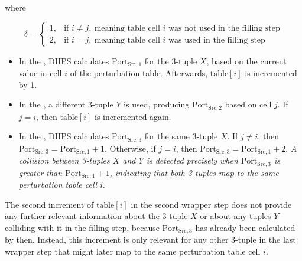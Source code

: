 \documentclass[twocolumn]{report}
\begin{document}
where
\vspace{-1cm}
\begin{center}
	\begin{adjustbox}{max width=\columnwidth}
		\begin{minipage}[t]{0.6\textwidth}
			\[
				\delta =
				\begin{cases}
					1, & \text{if } i \neq j,\ \text{meaning table cell } i \text{ was not used in the filling step}\\
					2, & \text{if } i = j,\ \text{meaning table cell } i \text{ was used in the filling step}
				\end{cases}
			\]
		\end{minipage}
	\end{adjustbox}
\end{center}
\vspace{0.5cm}
\begin{itemize}
	\item In the , DHPS calculates \(\text{Port}_{\text{Src},1}\) for the 3-tuple \( X \), based on the current value in cell \( i \) of the perturbation table. Afterwards, \(\text{table}[i]\) is incremented by 1.
	\item In the , a different 3-tuple \( Y \) is used, producing \(\text{Port}_{\text{Src},2}\) based on cell \( j \). If \( j = i \), then \(\text{table}[i]\) is incremented again.
	\item In the , DHPS calculates \(\text{Port}_{\text{Src},3}\) for the same 3-tuple \( X \). If \( j \neq i \), then \(\text{Port}_{\text{Src},3} = \text{Port}_{\text{Src},1} + 1\). Otherwise, if \( j = i \), then \(\text{Port}_{\text{Src},3} = \text{Port}_{\text{Src},1} + 2\). \textit{A collision between 3-tuples \( X \) and \( Y \) is detected precisely when \(\text{Port}_{\text{Src},3}\) is greater than \(\text{Port}_{\text{Src},1} + 1\), indicating that both 3-tuples map to the same perturbation table cell \( i \)}.
\end{itemize}

The second increment of \(\text{table}[i]\) in the second wrapper step does \alert{not provide any further relevant information} about the 3-tuple \( X \) or about any tuples \( Y \) colliding with it in the filling step, because \(\text{Port}_{\text{Src},3}\) has already been calculated by then. Instead, this increment is only relevant for any other 3-tuple in the last wrapper step that might later map to the same perturbation table cell \( i \).
\end{document}
